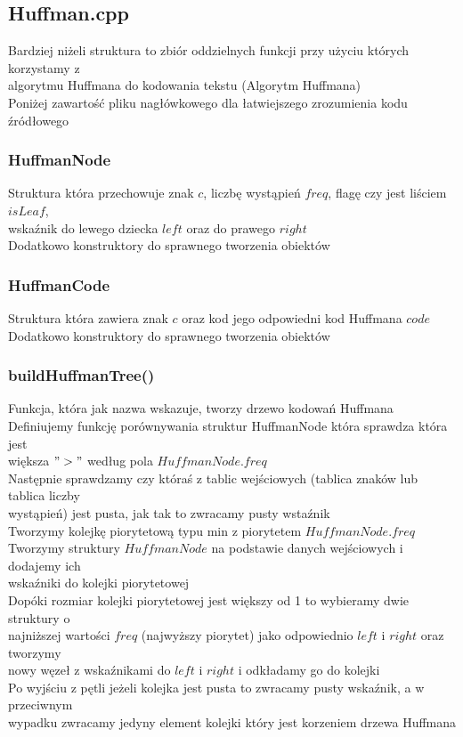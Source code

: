 \documentclass{article}
\begin{document}
\subsection{Huffman.cpp}
Bardziej niżeli struktura to zbiór oddzielnych funkcji przy użyciu których korzystamy z \\ algorytmu Huffmana do kodowania tekstu (Algorytm Huffmana) \\ Poniżej zawartość pliku nagłówkowego dla łatwiejszego zrozumienia kodu źródłowego

\subsubsection{HuffmanNode}
Struktura która przechowuje znak $c$, liczbę wystąpień $freq$, flagę czy jest liściem $isLeaf$, \\ wskaźnik do lewego dziecka $left$ oraz do prawego $right$ \\ Dodatkowo konstruktory do sprawnego tworzenia obiektów
\subsubsection{HuffmanCode}
Struktura która zawiera znak $c$ oraz kod jego odpowiedni kod Huffmana $code$ \\ Dodatkowo konstruktory do sprawnego tworzenia obiektów
\subsubsection{buildHuffmanTree()}
Funkcja, która jak nazwa wskazuje, tworzy drzewo kodowań Huffmana \\ Definiujemy funkcję porównywania struktur HuffmanNode która sprawdza która jest \\ większa $">"$ według pola $HuffmanNode.freq$ \\ Następnie sprawdzamy czy któraś z tablic wejściowych (tablica znaków lub tablica liczby \\ wystąpień) jest pusta, jak tak to zwracamy pusty wstaźnik \\ Tworzymy kolejkę piorytetową typu min z piorytetem $HuffmanNode.freq$ \\ Tworzymy struktury $HuffmanNode$ na podstawie danych wejściowych i dodajemy ich \\ wskaźniki do kolejki piorytetowej \\ Dopóki rozmiar kolejki piorytetowej jest większy od 1 to wybieramy dwie struktury o \\ najniższej wartości $freq$ (najwyższy piorytet) jako odpowiednio $left$ i $right$ oraz tworzymy \\ nowy węzeł z wskaźnikami do $left$ i $right$ i odkładamy go do kolejki \\ Po wyjściu z pętli jeżeli kolejka jest pusta to zwracamy pusty wskaźnik, a w przeciwnym \\ wypadku zwracamy jedyny element kolejki który jest korzeniem drzewa Huffmana
\end{document}

